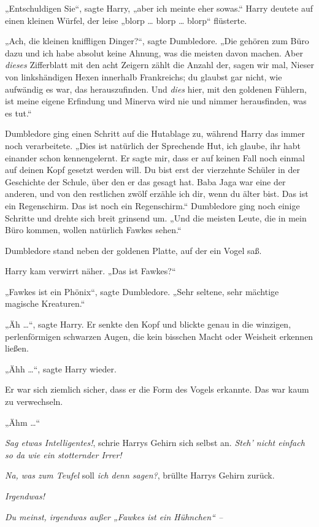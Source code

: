 {„Entschuldigen Sie“, sagte Harry, „aber ich meinte eher sowas.“ Harry deutete auf einen kleinen Würfel, der leise „blorp … blorp … blorp“ flüsterte.

„Ach, die kleinen kniffligen Dinger?“, sagte Dumbledore. „Die gehören zum Büro dazu und ich habe absolut keine Ahnung, was die meisten davon machen. Aber \emph{dieses} Zifferblatt mit den acht Zeigern zählt die Anzahl der, sagen wir mal, Nieser von linkshändigen Hexen innerhalb Frankreichs; du glaubst gar nicht, wie aufwändig es war, das herauszufinden. Und \emph{dies} hier, mit den goldenen Fühlern, ist meine eigene Erfindung und Minerva wird nie und nimmer herausfinden, was es tut.“

Dumbledore ging einen Schritt auf die Hutablage zu, während Harry das immer noch verarbeitete. „Dies ist natürlich der Sprechende Hut, ich glaube, ihr habt einander schon kennengelernt. Er sagte mir, dass er auf keinen Fall noch einmal auf deinen Kopf gesetzt werden will. Du bist erst der vierzehnte Schüler in der Geschichte der Schule, über den er das gesagt hat. Baba Jaga war eine der anderen, und von den restlichen zwölf erzähle ich dir, wenn du älter bist. Das ist ein Regenschirm. Das ist noch ein Regenschirm.“ Dumbledore ging noch einige Schritte und drehte sich breit grinsend um. „Und die meisten Leute, die in mein Büro kommen, wollen natürlich Fawkes sehen.“

Dumbledore stand neben der goldenen Platte, auf der ein Vogel saß.

Harry kam verwirrt näher. „Das ist Fawkes?“

„Fawkes ist ein Phönix“, sagte Dumbledore. „Sehr seltene, sehr mächtige magische Kreaturen.“

„Äh …“, sagte Harry. Er senkte den Kopf und blickte genau in die winzigen, perlenförmigen schwarzen Augen, die kein bisschen Macht oder Weisheit erkennen ließen.

„Ähh …“, sagte Harry wieder.

Er war sich ziemlich sicher, dass er die Form des Vogels erkannte. Das war kaum zu verwechseln.

„Ähm …“

\emph{Sag etwas Intelligentes!}, schrie Harrys Gehirn sich selbst an. \emph{Steh' nicht einfach so da wie ein stotternder Irrer!}

\emph{Na, was zum Teufel} soll \emph{ich denn sagen?}, brüllte Harrys Gehirn zurück.

\emph{Irgendwas!}

\emph{Du meinst, irgendwas außer „Fawkes ist ein Hühnchen“ --}

}
